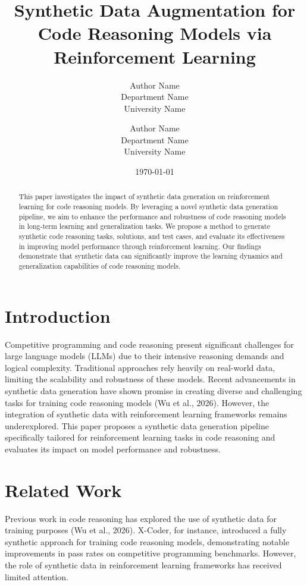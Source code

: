 \documentclass{article}
\title{Synthetic Data Augmentation for Code Reasoning Models via Reinforcement Learning}
\author{Author Name\\
Department Name\\
University Name\\
\and
Author Name\\
Department Name\\
University Name
}
\date{\today}
\begin{document}
\maketitle

\begin{abstract}
This paper investigates the impact of synthetic data generation on reinforcement learning for code reasoning models. By leveraging a novel synthetic data generation pipeline, we aim to enhance the performance and robustness of code reasoning models in long-term learning and generalization tasks. We propose a method to generate synthetic code reasoning tasks, solutions, and test cases, and evaluate its effectiveness in improving model performance through reinforcement learning. Our findings demonstrate that synthetic data can significantly improve the learning dynamics and generalization capabilities of code reasoning models.
\end{abstract}

\section{Introduction}
\label{sec:introduction}

Competitive programming and code reasoning present significant challenges for large language models (LLMs) due to their intensive reasoning demands and logical complexity. Traditional approaches rely heavily on real-world data, limiting the scalability and robustness of these models. Recent advancements in synthetic data generation have shown promise in creating diverse and challenging tasks for training code reasoning models (Wu et al., 2026). However, the integration of synthetic data with reinforcement learning frameworks remains underexplored. This paper proposes a synthetic data generation pipeline specifically tailored for reinforcement learning tasks in code reasoning and evaluates its impact on model performance and robustness.

\section{Related Work}
\label{sec:related_work}

Previous work in code reasoning has explored the use of synthetic data for training purposes (Wu et al., 2026). X-Coder, for instance, introduced a fully synthetic approach for training code reasoning models, demonstrating notable improvements in pass rates on competitive programming benchmarks. However, the role of synthetic data in reinforcement learning frameworks has received limited attention. 
\end{document}
